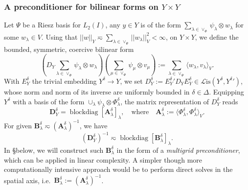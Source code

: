 \documentclass[11pt,a4paper,oneside,english]{amsart}
\numberwithin{equation}{section}
\numberwithin{theorem}{section}
\theoremstyle{definition}
\DeclareMathOperator{\blockdiag}{blockdiag}
\newcommand{\la}{\langle}
\newcommand{\ra}{\rangle}
\newcommand{\cL}{\mathcal L}
\newcommand{\Lis}{\cL\mathrm{is}}
\newcommand{\jw}[1]{{\color{red}{JW: #1}}}
\begin{document}
\subsubsection{A preconditioner for bilinear forms on $Y \times Y$}
Let $\Psi$ be a Riesz basis for $L_2(I)$, any $y \in Y$ is of the form
$\sum_{\lambda \in \vee_{\Phi}} \psi_\lambda \otimes w_\lambda$ for some $w_\lambda \in V$.
Using that $||w||_Y \eqsim \sum_{\lambda \in \vee_\Psi} ||w_\lambda||_V^2 < \infty$,
on $Y \times Y$, we define the bounded, symmetric, coercive bilinear form
\[
  (D_Y \sum_{\lambda \in \vee_{\Phi}} \psi_\lambda \otimes w_\lambda)(\sum_{\mu \in \vee_{\Phi}} \psi_\mu \otimes v_\mu ) := \sum_{\lambda \in \vee_\Psi} \la w_\lambda, v_\lambda \ra_V.
\]
With $E_Y^\delta$ the trivial embedding $Y^\delta \to Y$,
we set $D_Y^\delta := {E_Y^\delta}' D_Y E_Y^\delta \in \Lis(Y^\delta, {Y^\delta}')$,
whose norm and norm of its inverse are uniformly bounded in $\delta \in \Delta$.
Equipping $Y^\delta$ with a basis of the form $\cup_\lambda \psi_\lambda \otimes \Phi_\lambda^\delta$,
\jw{$\Phi_\lambda^\delta$ moet een beter teken voor}
the matrix representation of $D_Y^\delta$ reads
\[
  \mathbf D_Y^\delta = \blockdiag [\mathbf A_\lambda^\delta]_\lambda, \quad \text{where} \quad \mathbf A_\lambda^\delta := \la \Phi_\lambda^\delta, \Phi_\lambda^\delta \ra_V.
\]
For given $\mathbf B_\lambda^\delta \eqsim (\mathbf A_\lambda^\delta)^{-1}$, we have
\[
  (\mathbf D_Y^\delta)^{-1} \eqsim \blockdiag[\mathbf B_\lambda^\delta]_\lambda.
\]
In \S below, we will construct such $\mathbf B_\lambda^\delta$ in the form of a
\emph{multigrid preconditioner}, which can be applied in linear complexity. A
simpler though more computationally intensive approach would be to perform direct
solves in the spatial axis, i.e.~$\mathbf B_\lambda^\delta := (\mathbf A_\lambda^\delta)^{-1}$.
\end{document}
